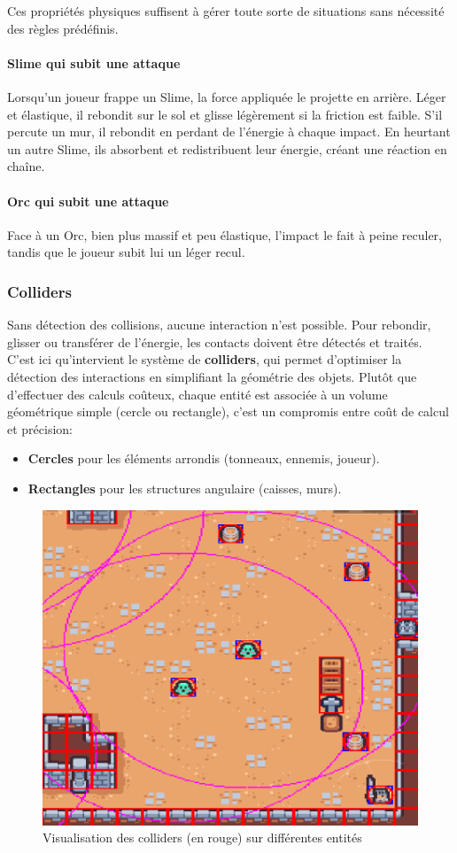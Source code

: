 \documentclass[a4paper,11pt]{article}
\begin{document}
Ces propriétés physiques suffisent à gérer toute sorte de situations sans nécessité des règles prédéfinis.

\paragraph{Slime qui subit une attaque}
Lorsqu’un joueur frappe un Slime, la force appliquée le projette en arrière. Léger et élastique, il rebondit sur le sol et glisse légèrement si la friction est faible. S’il percute un mur, il rebondit en perdant de l’énergie à chaque impact. En heurtant un autre Slime, ils absorbent et redistribuent leur énergie, créant une réaction en chaîne.

\paragraph{Orc qui subit une attaque}
Face à un Orc, bien plus massif et peu élastique, l’impact le fait à peine reculer, tandis que le joueur subit lui un léger recul.

\subsubsection{Colliders}
\label{sec:colliders}
Sans détection des collisions, aucune interaction n'est possible. Pour rebondir, glisser ou transférer de l’énergie, les contacts doivent être détectés et traités. \\

C’est ici qu’intervient le système de \textbf{colliders}, qui permet d’optimiser la détection des interactions en simplifiant la géométrie des objets. Plutôt que d’effectuer des calculs coûteux, chaque entité est associée à un volume géométrique simple (cercle ou rectangle), c'est un compromis entre coût de calcul et précision: 
\begin{itemize}
    \item \textbf{Cercles} pour les éléments arrondis (tonneaux, ennemis, joueur).
    \item \textbf{Rectangles} pour les structures angulaire (caisses, murs).
\end{itemize}

\begin{figure}[h]
    \centering
    \includegraphics[width=0.5\linewidth]{./img/debugCollider.png}
    \caption{Visualisation des colliders (en rouge) sur différentes entités}
    \label{fig:colliders_exemple}
\end{figure}
\end{document}

